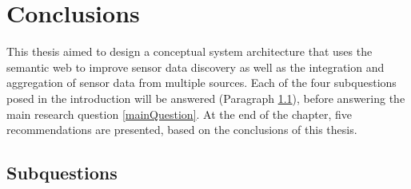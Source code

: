 
\chapter{Conclusions}
\label{chap:conclusion}

This thesis aimed to design a conceptual system architecture that uses the semantic web to improve sensor data discovery as well as the integration and aggregation of sensor data from multiple sources. Each of the four subquestions posed in the introduction will be answered (Paragraph \ref{subquestions}), before answering the main research question \ref{mainQuestion}. At the end of the chapter, five recommendations are presented, based on the conclusions of this thesis.

\section{Subquestions}
\label{subquestions}
